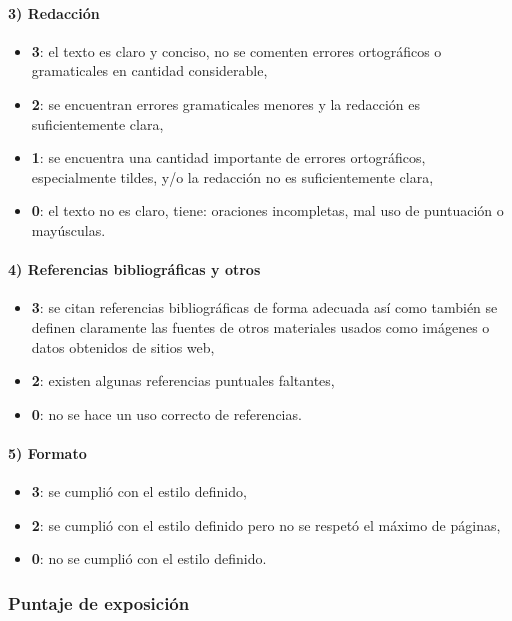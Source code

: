 \documentclass[a4paper,11pt,twocolumn]{article}
\begin{document}
\paragraph{3) Redacción}
\begin{itemize}
	\item \textbf{3}: el texto es claro y conciso, no se comenten errores ortográficos o gramaticales en cantidad considerable,
	\item \textbf{2}: se encuentran errores gramaticales menores y la redacción es suficientemente clara,
	\item \textbf{1}: se encuentra una cantidad importante de errores ortográficos, especialmente tildes, y/o la redacción no es suficientemente clara,
	\item \textbf{0}: el texto no es claro, tiene: oraciones incompletas, mal uso de puntuación o mayúsculas.
\end{itemize}

\paragraph{4) Referencias bibliográficas y otros}
\begin{itemize}
	\item \textbf{3}: se citan referencias bibliográficas de forma adecuada así como también se definen claramente las fuentes de otros materiales usados como imágenes o datos obtenidos de sitios web,
	\item \textbf{2}: existen algunas referencias puntuales faltantes,
	\item \textbf{0}: no se hace un uso correcto de referencias.
\end{itemize}

\paragraph{5) Formato}
\begin{itemize}
	\item \textbf{3}: se cumplió con el estilo definido,
	\item \textbf{2}: se cumplió con el estilo definido pero no se respetó el máximo de páginas,
	\item \textbf{0}: no se cumplió con el estilo definido.
\end{itemize}



\subsubsection{Puntaje de exposición}
\end{document}
